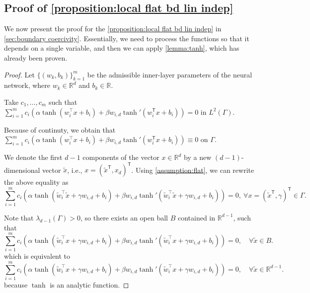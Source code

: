 \documentclass{article}
\newcommand{\T}{\mathsf{T}}
\begin{document}
\subsection{Proof of \texorpdfstring{\cref{proposition:local flat bd lin indep}}{Proposition \ref{proposition:local flat bd lin indep}}}\label{sec:proof local flat bd lin indep}
We now present the proof for the \cref{proposition:local flat bd lin indep} in \cref{sec:boundary coercivity}. 
Essentially, we need to process the functions so that it depends on a single variable, and then we can apply \cref{lemma:tanh}, which has already been proven.
\begin{proof}
    Let $\{(w_{k},b_{k})\}_{k=1}^{m}$ be the admissible inner-layer parameters of the neural network, where $w_{k}\in\mathbb{R}^{d}$ and $b_{k}\in\mathbb{R}$.

    Take $c_{1},\ldots,c_{m}$ such that $\sum_{i=1}^{m}c_{i}\left( \alpha \tanh(w_i^\top x + b_i)+\beta w_{i,d} \tanh'(w_i^\T x+b_i)\right)= 0$ in $L^{2}(\Gamma)$. 
    
    Because of continuty, we obtain that $\sum_{i=1}^{m}c_{i}\left( \alpha \tanh(w_i^\top x + b_i)+\beta w_{i,d} \tanh'(w_i^\T x+b_i)\right)\equiv 0$ on $\Gamma$.

    We denote the first \(d-1\) components of the vector \( x\in \mathbb{R}^d \) by a new \((d-1)\)-dimensional vector \(\tilde{x}\), i.e., $x=(\tilde{x}^\T ,x_{d})^\T$. 
    Using \cref{assumption:flat}, we can rewrite the above equality as
    \begin{equation*}
        \sum_{i=1}^{m}c_{i}\left( \alpha \tanh(\tilde{w}_i^\top \tilde{x} +\gamma w_{i,d}+ b_i)+\beta w_{i,d} \tanh'(\tilde{w}_i^\top \tilde{x} +\gamma w_{i,d}+b_i)\right)=0, \ \forall x=(\tilde{x}^\T,\gamma)^\T\in\Gamma .
    \end{equation*}

    Note that $\lambda_{d-1}(\Gamma)>0$, so there exists an open ball $B$ contained in $\mathbb{R}^{d-1}$, such that 
    \begin{equation*}
        \sum_{i=1}^{m}c_{i}\left( \alpha \tanh(\tilde{w}_i^\top x +\gamma w_{i,d}+ b_i)+\beta w_{i,d} \tanh'(\tilde{w}_i^\top x +\gamma w_{i,d}+b_i)\right)=0, \quad \forall \tilde{x} \in B .
    \end{equation*}
    which is equivalent to
    \begin{equation}
        \sum_{i=1}^{m}c_{i}\left( \alpha \tanh(\tilde{w}_i^\top x +\gamma w_{i,d}+ b_i)+\beta w_{i,d} \tanh'(\tilde{w}_i^\top x +\gamma w_{i,d}+b_i)\right)=0, \quad \forall \tilde{x} \in \mathbb{R}^{d-1} .\label{eq:all space}
    \end{equation}
    because $\tanh$ is an analytic function.


\end{proof}
\end{document}
